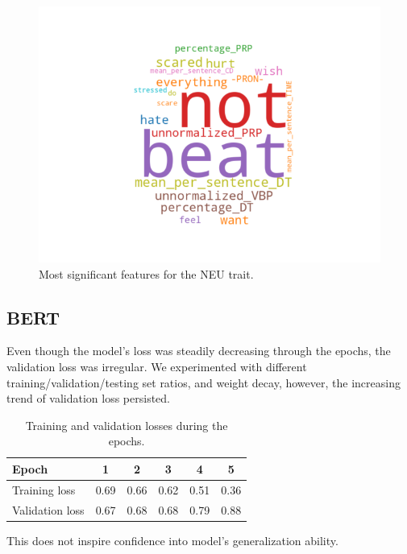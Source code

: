 \documentclass[10pt, a4paper]{article}
\begin{document}
\begin{figure}
\begin{center}
  \includegraphics[width=\columnwidth]{figures/cNEU.png}
  \caption{Most significant features for the NEU trait.}
  \label{fig:figure5}
\end{center}
\end{figure}

\subsection{BERT}

Even though the model's loss was steadily decreasing through the epochs, the validation loss was irregular. 
We experimented with different training/validation/testing set ratios, and weight decay, however, the increasing trend of validation loss persisted. 

\begin{table}[H]
	\begin{tabular}{|l|c|c|c|c|c|}
    \hline
    Epoch & 1 & 2 & 3 & 4 & 5\\
		\hline
		Training loss & 0.69 & 0.66 & 0.62 & 0.51 & 0.36\\ 
    \hline
		Validation loss & 0.67 & 0.68 & 0.68 & 0.79 & 0.88\\ 
    \hline
	\end{tabular}
	\caption{Training and validation losses during the epochs.}
	\label{losses}
\end{table}

This does not inspire confidence into model's generalization ability.
\end{document}
